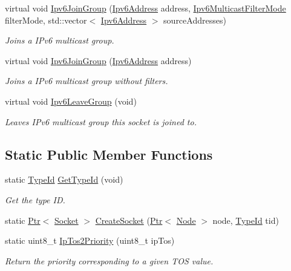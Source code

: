 \begin{DoxyCompactItemize}
virtual void \hyperlink{classns3_1_1Socket_aa9c414660bee2cd56bf6cdc4111b4744}{Ipv6\+Join\+Group} (\hyperlink{classns3_1_1Ipv6Address}{Ipv6\+Address} address, \hyperlink{classns3_1_1Socket_a96f39fe2b73d5691b319093a1e31615d}{Ipv6\+Multicast\+Filter\+Mode} filter\+Mode, std\+::vector$<$ \hyperlink{classns3_1_1Ipv6Address}{Ipv6\+Address} $>$ source\+Addresses)
\begin{DoxyCompactList}\small\item\em Joins a I\+Pv6 multicast group. \end{DoxyCompactList}\item 
virtual void \hyperlink{classns3_1_1Socket_a706d6536707aecc387986298d34232cf}{Ipv6\+Join\+Group} (\hyperlink{classns3_1_1Ipv6Address}{Ipv6\+Address} address)
\begin{DoxyCompactList}\small\item\em Joins a I\+Pv6 multicast group without filters. \end{DoxyCompactList}\item 
virtual void \hyperlink{classns3_1_1Socket_af70f1ddca0d73f98103a2b86bec4c85e}{Ipv6\+Leave\+Group} (void)
\begin{DoxyCompactList}\small\item\em Leaves I\+Pv6 multicast group this socket is joined to. \end{DoxyCompactList}\end{DoxyCompactItemize}
\subsection*{Static Public Member Functions}
\begin{DoxyCompactItemize}
\item 
static \hyperlink{classns3_1_1TypeId}{Type\+Id} \hyperlink{classns3_1_1Socket_a65881c34b9dc8f45d44d3ffaf74d883b}{Get\+Type\+Id} (void)
\begin{DoxyCompactList}\small\item\em Get the type ID. \end{DoxyCompactList}\item 
static \hyperlink{classns3_1_1Ptr}{Ptr}$<$ \hyperlink{classns3_1_1Socket}{Socket} $>$ \hyperlink{classns3_1_1Socket_ad448a62bb50ad3dbac59c879a885a8d2}{Create\+Socket} (\hyperlink{classns3_1_1Ptr}{Ptr}$<$ \hyperlink{classns3_1_1Node}{Node} $>$ node, \hyperlink{classns3_1_1TypeId}{Type\+Id} tid)
\item 
static uint8\+\_\+t \hyperlink{classns3_1_1Socket_a81564620cc94d291f1dc5d79b2f13b4a}{Ip\+Tos2\+Priority} (uint8\+\_\+t ip\+Tos)
\begin{DoxyCompactList}\small\item\em Return the priority corresponding to a given T\+OS value. \end{DoxyCompactList}\end{DoxyCompactItemize}
